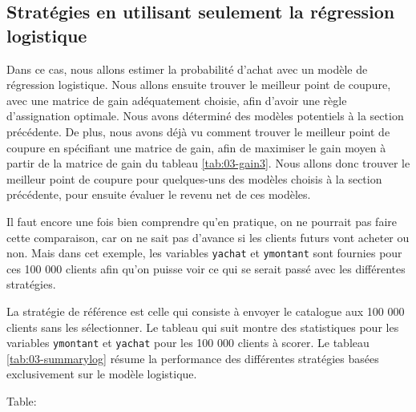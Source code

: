 \documentclass[
  11pt,
  letterpaper,
]{book}
\theoremstyle{definition}
\theoremstyle{definition}
\theoremstyle{definition}
\theoremstyle{remark}
\begin{document}
\hypertarget{stratuxe9gies-en-utilisant-seulement-la-ruxe9gression-logistique}{%
\subsection{Stratégies en utilisant seulement la régression logistique}\label{stratuxe9gies-en-utilisant-seulement-la-ruxe9gression-logistique}}

Dans ce cas, nous allons estimer la probabilité d'achat avec un modèle de régression logistique. Nous allons ensuite trouver le meilleur point de coupure, avec une matrice de gain adéquatement choisie, afin d'avoir une règle d'assignation optimale. Nous avons déterminé des modèles potentiels à la section précédente. De plus, nous avons déjà vu comment trouver le meilleur point de coupure en spécifiant une matrice de gain, afin de maximiser le gain moyen à partir de la matrice de gain du tableau \ref{tab:03-gain3}. Nous allons donc trouver le meilleur point de coupure pour quelques-uns des modèles choisis à la section précédente, pour ensuite évaluer le revenu net de ces modèles.

Il faut encore une fois bien comprendre qu'en pratique, on ne pourrait pas faire cette comparaison, car on ne sait pas d'avance si les clients futurs vont acheter ou non. Mais dans cet exemple, les variables \texttt{yachat} et \texttt{ymontant} sont fournies pour ces 100 000 clients afin qu'on puisse voir ce qui se serait passé avec les différentes stratégies.

La stratégie de référence est celle qui consiste à envoyer le catalogue aux 100 000 clients sans les sélectionner. Le tableau qui suit montre des statistiques pour les variables \texttt{ymontant} et \texttt{yachat} pour les 100 000 clients à scorer. Le tableau \ref{tab:03-summarylog} résume la performance des différentes stratégies basées exclusivement sur le modèle logistique.

Table:
\end{document}
